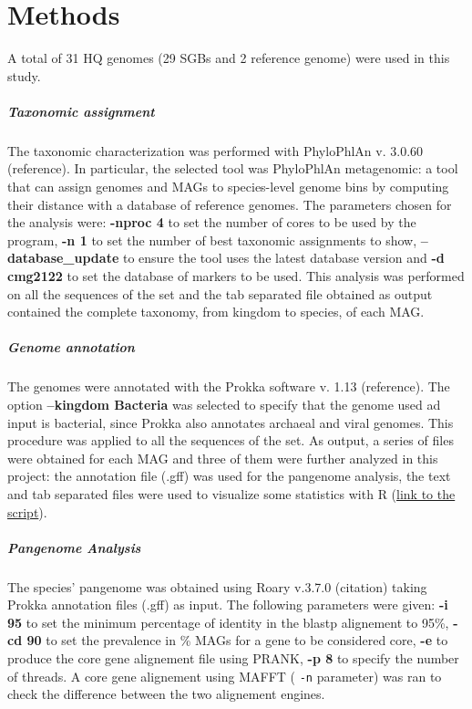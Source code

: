 \section*{Methods}



A total of 31 HQ genomes (29 SGBs and 2 reference genome) were used in this study.

\nocite{Tange2011a}

\subparagraph*{Taxonomic assignment}

The taxonomic characterization was performed with PhyloPhlAn v. 3.0.60 (reference). In particular, the selected tool was PhyloPhlAn metagenomic: a tool that can assign genomes and MAGs to species-level genome bins by computing their distance with a database of reference genomes. The parameters chosen for the analysis were: \textbf{-nproc 4} to set the number of cores to be used by the program, \textbf{-n 1} to set the number of best taxonomic assignments to show, \textbf{--database\_update} to ensure the tool uses the latest database version and \textbf{-d cmg2122} to set the database of markers to be used. This analysis was performed on all the sequences of the set and the tab separated file obtained as output contained the complete taxonomy, from kingdom to species, of each MAG.

\subparagraph*{Genome annotation}

The genomes were annotated with the Prokka software v. 1.13 (reference). The option \textbf{--kingdom Bacteria} was selected to specify that the genome used ad input is bacterial, since Prokka also annotates archaeal and viral genomes. This procedure was applied to all the sequences of the set. As output, a series of files were obtained for each MAG and three of them were further analyzed in this project: the annotation file (.gff) was used for the pangenome analysis, the text and tab separated files were used to visualize some statistics with R (\href{https://github.com/enricofrigoli/cmg_project/blob/main/Rscript/CMG_Rscript.md}{link to the script}).


\subparagraph*{Pangenome Analysis}

The species' pangenome was obtained using Roary v.3.7.0 (citation) taking Prokka annotation files (.gff) as input. 
The following parameters were given: \textbf{-i 95} to set the minimum percentage of identity
in the blastp alignement to 95\%, \textbf{-cd 90} to set the prevalence in \% MAGs for a gene
to be considered core, \textbf{-e} to produce the core gene alignement file using PRANK, \textbf{-p 8} to
specify the number of threads. A core gene alignement using MAFFT ( \texttt{-n} parameter) was ran to check
the difference between the two alignement engines.

